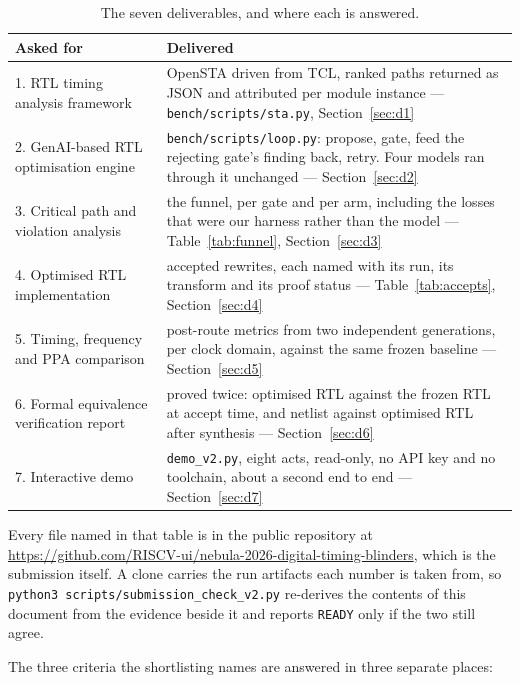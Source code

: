 \documentclass[11pt,a4paper]{article}
\newcommand{\file}[1]{\texttt{\small #1}}
\newcommand{\RepoURL}{https://github.com/RISCV-ui/nebula-2026-digital-timing-blinders}
\begin{document}
\begin{table}[h]
\centering\small
\begin{tabular}{@{}p{56mm}p{92mm}@{}}
\toprule
\textbf{Asked for} & \textbf{Delivered} \\
\midrule
1. RTL timing analysis framework & OpenSTA driven from TCL, ranked paths
returned as JSON and attributed per module instance ---
\file{bench/scripts/sta.py}, Section~\ref{sec:d1} \\
2. GenAI-based RTL optimisation engine & \file{bench/scripts/loop.py}: propose,
gate, feed the rejecting gate's finding back, retry. Four models ran through it
unchanged --- Section~\ref{sec:d2} \\
3. Critical path and violation analysis & the funnel, per gate and per arm,
including the losses that were our harness rather than the model ---
Table~\ref{tab:funnel}, Section~\ref{sec:d3} \\
4. Optimised RTL implementation & \numaccepted{} accepted rewrites, each named
with its run, its transform and its proof status --- Table~\ref{tab:accepts},
Section~\ref{sec:d4} \\
5. Timing, frequency and PPA comparison & post-route metrics from two
independent generations, per clock domain, against the same frozen baseline ---
Section~\ref{sec:d5} \\
6. Formal equivalence verification report & proved twice: optimised RTL against
the frozen RTL at accept time, and netlist against optimised RTL after
synthesis --- Section~\ref{sec:d6} \\
7. Interactive demo & \file{demo\_v2.py}, eight acts, read-only, no API key and
no toolchain, about a second end to end --- Section~\ref{sec:d7} \\
\bottomrule
\end{tabular}
\caption{The seven deliverables, and where each is answered.}
\label{tab:deliver}
\end{table}

Every file named in that table is in the public repository at
\url{\RepoURL}, which is the submission itself. A clone carries the run
artifacts each number is taken from, so
\file{python3 scripts/submission\_check\_v2.py} re-derives the contents of this
document from the evidence beside it and reports \texttt{READY} only if the two
still agree.

The three criteria the shortlisting names are answered in three separate
places:
\end{document}
